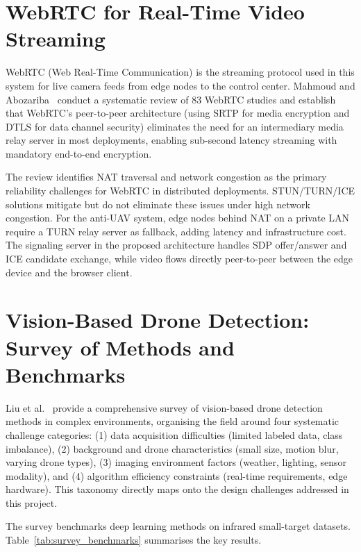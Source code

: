 \documentclass[12pt,a4paper]{report}
\begin{document}
\section{WebRTC for Real-Time Video Streaming}

WebRTC (Web Real-Time Communication) is the streaming protocol used in
this system for live camera feeds from edge nodes to the control center.
Mahmoud and Abozariba~\cite{mahmoud2025webrtc} conduct a systematic review
of 83 WebRTC studies and establish that WebRTC's peer-to-peer architecture
(using SRTP for media encryption and DTLS for data channel security)
eliminates the need for an intermediary media relay server in most
deployments, enabling sub-second latency streaming with mandatory
end-to-end encryption.

The review identifies NAT traversal and network congestion as the primary
reliability challenges for WebRTC in distributed deployments. STUN/TURN/ICE
solutions mitigate but do not eliminate these issues under high network
congestion. For the anti-UAV system, edge nodes behind NAT on a private
LAN require a TURN relay server as fallback, adding latency and
infrastructure cost. The signaling server in the proposed architecture
handles SDP offer/answer and ICE candidate exchange, while video flows
directly peer-to-peer between the edge device and the browser client.

\section{Vision-Based Drone Detection: Survey of Methods and Benchmarks}

Liu et al.~\cite{liu2024survey} provide a comprehensive survey of
vision-based drone detection methods in complex environments, organising
the field around four systematic challenge categories: (1) data acquisition
difficulties (limited labeled data, class imbalance), (2) background and
drone characteristics (small size, motion blur, varying drone types),
(3) imaging environment factors (weather, lighting, sensor modality), and
(4) algorithm efficiency constraints (real-time requirements, edge hardware).
This taxonomy directly maps onto the design challenges addressed in this project.

The survey benchmarks deep learning methods on infrared small-target datasets.
Table~\ref{tab:survey_benchmarks} summarises the key results.
\end{document}
